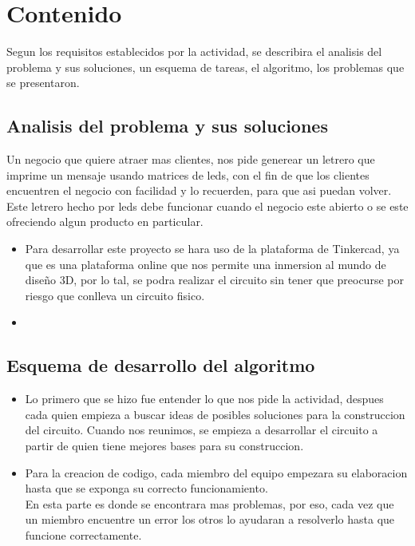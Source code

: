 \documentclass{article}
\begin{document}
\newpage

\section{Contenido} \label{contenido}
Segun los requisitos establecidos por la actividad, se describira el analisis del problema y sus soluciones, un esquema de tareas, el algoritmo, los problemas que se presentaron. 

\subsection{Analisis del problema y sus soluciones}
Un negocio que quiere atraer mas clientes, nos pide generear un letrero que imprime un mensaje usando matrices de leds, con el fin de que los clientes encuentren el negocio con facilidad y lo recuerden, para que asi puedan volver. Este letrero hecho por leds debe funcionar cuando el negocio este abierto o se este ofreciendo algun producto en particular.
\begin{itemize}
    \item Para desarrollar este proyecto se hara uso de la plataforma de Tinkercad, ya que es una plataforma online que nos permite una inmersion al mundo de diseño 3D, por lo tal, se podra realizar el circuito sin tener que preocurse por riesgo que conlleva un circuito fisico.
    \item 
\end{itemize}

\subsection{Esquema de desarrollo del algoritmo}
\begin{itemize}
    \item Lo primero que se hizo fue entender lo que nos pide la actividad, despues cada quien empieza a buscar ideas de posibles soluciones para la construccion del circuito. Cuando nos reunimos, se empieza a desarrollar el circuito a partir de quien tiene mejores bases para su construccion.
    \item Para la creacion de codigo, cada miembro del equipo empezara su elaboracion hasta que se exponga su correcto funcionamiento.\\ 
    En esta parte es donde se encontrara mas problemas, por eso, cada vez que un miembro encuentre un error los otros lo ayudaran a resolverlo hasta que funcione correctamente.
\end{itemize}
\end{document}

